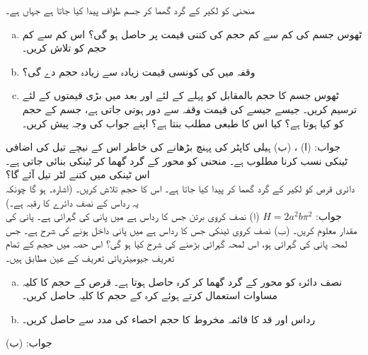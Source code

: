 منحنی  کو لکیر  کے گرد گھما کر جسم طواف پیدا کیا جاتا ہے جہاں  ہے۔
\begin{enumerate}[a.]
\item
ٹھوس جسم کی کم سے کم حجم  کی کتنی قیمت پر حاصل ہو گی؟ اس کم سے کم حجم کو تلاش کریں۔
\item
وقفہ  میں کی کونسی قیمت زیادہ سے زیادہ حجم دے گی؟
\item
ٹھوس جسم کا حجم بالمقابل  کو پہلے  کے لئے اور بعد میں بڑی قیمتوں کے لئے ترسیم کریں۔ جیسے جیسے   کی قیمت وقفہ  سے دور ہوتی جاتی ہے، جسم کے حجم کو کیا ہوتا ہے؟ کیا اس کا طبعی مطلب بنتا ہے؟ اپنے جواب کی وجہ پیش کریں۔
\end{enumerate}
جواب:\quad
(ا) ، (ب) 
ہیلی کاپٹر کی پہنچ  بڑھانے کی خاطر اس کے نیچے تیل کی اضافی ٹینکی نسب کرنا مطلوب ہے۔ منحنی  کو  محور کے گرد گھما کر ٹینکی بنائی جاتی ہے۔ اس ٹینکی میں کتنے لٹر تیل آئے گا؟
\\
دائری قرص  کو لکیر  کے گرد گھما کر  پیدا کیا جاتا ہے۔ اس کا حجم تلاش کریں۔ (اشارہ۔  ہو گا چونکہ یہ رداس  کے نصف دائرے کا رقبہ ہے۔)\\
جواب:\quad
$H=2a^2b\pi^2$
(ا) نصف کروی برتن جس کا رداس  ہے میں پانی کی گہرائی  ہے۔ پانی کی مقدار معلوم کریں۔ (ب) نصف کروی ٹینکی جس کا رداس  ہے میں پانی داخل ہونے کی شرح  ہے۔ جس لمحہ پانی کی گہرائی  ہو، اس لمحہ گہرائی بڑھنے کی شرح کیا ہو گی؟
اس حصہ میں حجم کے تمام تعریف جیومیٹریائی تعریف کے عین مطابق ہیں۔
\begin{enumerate}[a.]
\item
نصف دائرہ  کو  محور کے گرد گھما کر کرہ حاصل ہوتا ہے۔ قرص کے حجم کا کلیہ مساوات  استعمال کرتے ہوئے کرہ کے حجم کا کلیہ  حاصل کریں۔
\item
رداس  اور قد  کا قائمہ مخروط کا حجم احصاء کی مدد سے حاصل کریں۔
\end{enumerate}
جواب:\quad
(ب) 

